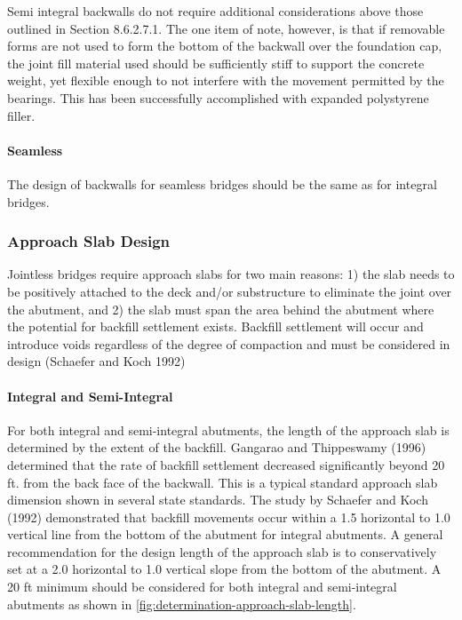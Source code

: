 Semi integral backwalls do not require additional considerations above those outlined in Section 8.6.2.7.1. The one item of note, however, is that if removable forms are not used to form the bottom of the backwall over the foundation cap, the joint fill material used should be sufficiently stiff to support the concrete weight, yet flexible enough to not interfere with the movement permitted by the bearings. This has been successfully accomplished with expanded polystyrene filler.

\paragraph{Seamless}
The design of backwalls for seamless bridges should be the same as for integral bridges.


\subsubsection{Approach Slab Design}
Jointless bridges require approach slabs for two main reasons: 1) the slab needs to be positively attached to the
deck and/or substructure to eliminate the joint over the abutment, and 2) the slab must span the area behind the abutment where the potential for backfill settlement exists. Backfill settlement will occur and introduce voids
regardless of the degree of compaction and must be considered in design (Schaefer and Koch 1992)

\paragraph{Integral and Semi-Integral}

For both integral and semi-integral abutments, the length of the approach slab is determined by the extent of the
backfill. Gangarao and Thippeswamy (1996) determined that the rate of backfill settlement decreased significantly
beyond 20 ft. from the back face of the backwall. This is a typical standard approach slab dimension shown in several
state standards. The study by Schaefer and Koch (1992) demonstrated that backfill movements occur within a 1.5
horizontal to 1.0 vertical line from the bottom of the abutment for integral abutments. A general recommendation for
the design length of the approach slab is to conservatively set at a 2.0 horizontal to 1.0 vertical slope from the bottom
of the abutment. A 20 ft minimum should be considered for both integral and semi-integral abutments as shown in
\cref{fig:determination-approach-slab-length}.

